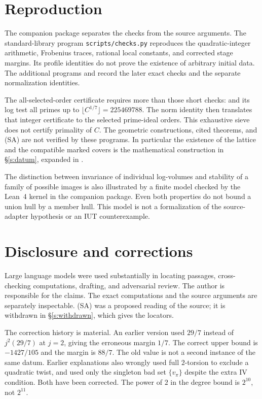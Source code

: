 \documentclass[11pt]{article}
\theoremstyle{plain}
\theoremstyle{definition}
\newcommand{\SA}{\textup{(SA)}}
\begin{document}
\section{Reproduction}\label{s:repro}

The companion package \cite{Firstfull} separates the checks from the source
arguments.  The standard-library program \texttt{scripts/checks.py}
reproduces the quadratic-integer arithmetic, Frobenius traces, rational
local constants, and corrected stage margins.  Its profile identities
do not prove the existence of arbitrary initial data.  The additional
programs  and
 record the later exact checks
and the separate normalization identities.

The all-selected-order certificate requires more than those short checks:
 and its log test all
primes up to $\lfloor C^{1/7}\rfloor=225469788$.  The norm identity then
translates that integer certificate to the selected prime-ideal orders.
This exhaustive sieve does not certify primality of $C$.
The geometric constructions, cited theorems, and \SA{} are not verified
by these programs.  In particular the existence of the lattice and the
compatible marked covers is the mathematical construction in
\S\ref{s:datum}, expanded in \cite[\S4]{Firstfull}.

The distinction between invariance of individual log-volumes and stability
of a family of possible images is also illustrated by a finite model
checked by the Lean~4 kernel in the companion package.  Even both
properties do not bound a union hull by a member hull.  This model is
not a formalization of the source-adapter hypothesis or an IUT counterexample.

\section*{Disclosure and corrections}

Large language models were used substantially in locating passages,
cross-checking computations, drafting, and adversarial review.
The author is responsible for the claims.  The exact computations and the
source arguments are separately inspectable.  \SA{} was a proposed reading of
the source; it is withdrawn in \S\ref{s:withdrawn}, which gives the locators.

The correction history is material.  An earlier version used $29/7$
instead of $j^2(29/7)$ at $j=2$, giving the erroneous margin $1/7$.
The correct upper bound is $-1427/105$ and the margin is $88/7$.
The old value is not a second instance of the same datum.
Earlier explanations also wrongly used full $2$-torsion to exclude a
quadratic twist, and used only the singleton bad set $\{v_\pi\}$ despite
the extra IV condition.  Both have been corrected.
The power of $2$ in the degree bound is $2^{10}$, not $2^{11}$.
\end{document}
